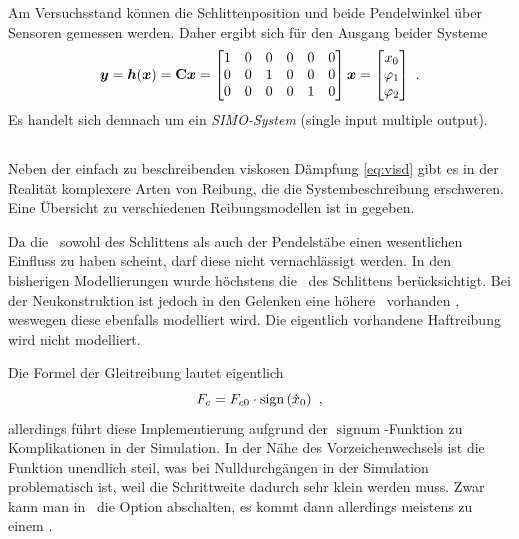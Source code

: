 Am Versuchsstand können die Schlittenposition und beide Pendelwinkel über Sensoren gemessen werden. Daher ergibt sich für den Ausgang beider Systeme
\begin{align}
	\boldsymbol{y} = \boldsymbol{h}(\boldsymbol{x})
	= {\boldsymbol{\mathrm{C}}} \boldsymbol{x}
	= \begin{bmatrix}
		1 & 0 & 0 & 0 & 0 & 0 \\
		0 & 0 & 1 & 0 & 0 & 0 \\
		0 & 0 & 0 & 0 & 1 & 0 
	\end{bmatrix} \boldsymbol{x}
	= \begin{bmatrix}
		x_0 \\ \varphi_1 \\ \varphi_2
	\end{bmatrix}  \ .
	\label{eq:hx}
\end{align}
Es handelt sich demnach um ein \emph{SIMO-System} (single input multiple output). 


\subsection{\crb}\label{sec:crb}

Neben der einfach zu beschreibenden viskosen Dämpfung \eqref{eq:visd} gibt es in der Realität komplexere Arten von Reibung, die die Systembeschreibung erschweren. 
Eine Übersicht zu verschiedenen Reibungsmodellen ist in \cite{ribeiro} gegeben.

Da die \crb\ sowohl des Schlittens als auch der Pendelstäbe einen wesentlichen Einfluss zu haben scheint, darf diese nicht vernachlässigt werden. 
In den bisherigen Modellierungen wurde höchstens die \crb\ des Schlittens berücksichtigt. 
Bei der Neukonstruktion ist jedoch in den Gelenken eine höhere \crb\ vorhanden , weswegen diese ebenfalls modelliert wird.
Die eigentlich vorhandene Haftreibung wird nicht modelliert.

Die Formel der Gleitreibung lautet eigentlich 
	\[
	F_c = F_{c0}  \cdot  \mathrm{sign}\left(\dot{x}_0\right) \ ,
\]
allerdings führt diese Implementierung aufgrund der $\operatorname{signum}$-Funktion  zu Komplikationen in der Simulation.
In der Nähe des Vorzeichenwechsels ist die Funktion unendlich steil, was bei Nulldurchgängen in der Simulation problematisch ist, weil die Schrittweite dadurch sehr klein werden muss.
Zwar kann man in \sm\ die Option  abschalten, es kommt dann allerdings meistens zu einem . 
\cite{modsim}


